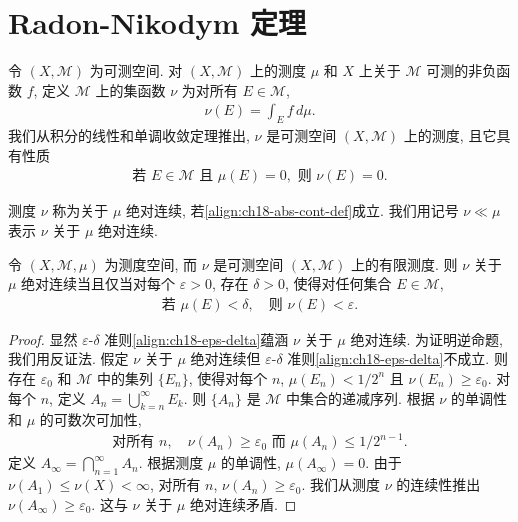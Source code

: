 \documentclass[../../main.tex]{subfiles}
\begin{document}
\section{Radon-Nikodym 定理}\label{section:ch18-radon-nikodym}

令 $(X,\mathcal{M})$ 为可测空间. 对 $(X,\mathcal{M})$ 上的测度 $\mu$ 和 $X$ 上关于 $\mathcal{M}$ 可测的非负函数 $f$, 定义 $\mathcal{M}$ 上的集函数 $\nu$ 为对所有 $E\in\mathcal{M}$,
\begin{align}
\nu(E)=\int_{E}f\,d\mu.\label{align:ch18-rn-def}
\end{align}
我们从积分的线性和单调收敛定理推出, $\nu$ 是可测空间 $(X,\mathcal{M})$ 上的测度, 且它具有性质
\begin{align}
\text{若 }E\in\mathcal{M}\text{ 且 }\mu(E)=0,\text{ 则 }\nu(E)=0.\label{align:ch18-abs-cont-def}
\end{align}

\begin{definition}[绝对连续]\label{definition:ch18-abs-continuous}
测度 $\nu$ 称为关于 $\mu$ 绝对连续, 若\eqref{align:ch18-abs-cont-def}成立. 我们用记号 $\nu\ll\mu$ 表示 $\nu$ 关于 $\mu$ 绝对连续.
\end{definition}

\begin{proposition}\label{proposition:ch18-abs-cont-eps-delta}
令 $(X,\mathcal{M},\mu)$ 为测度空间, 而 $\nu$ 是可测空间 $(X,\mathcal{M})$ 上的有限测度. 则 $\nu$ 关于 $\mu$ 绝对连续当且仅当对每个 $\varepsilon>0$, 存在 $\delta>0$, 使得对任何集合 $E\in\mathcal{M}$,
\begin{align}
\text{若 }\mu(E)<\delta,\quad\text{则 }\nu(E)<\varepsilon.\label{align:ch18-eps-delta}
\end{align}
\end{proposition}

\begin{proof}
显然 $\varepsilon$-$\delta$ 准则\eqref{align:ch18-eps-delta}蕴涵 $\nu$ 关于 $\mu$ 绝对连续. 为证明逆命题, 我们用反证法. 假定 $\nu$ 关于 $\mu$ 绝对连续但 $\varepsilon$-$\delta$ 准则\eqref{align:ch18-eps-delta}不成立. 则存在 $\varepsilon_{0}$ 和 $\mathcal{M}$ 中的集列 $\{E_{n}\}$, 使得对每个 $n$, $\mu(E_{n})<1/2^{n}$ 且 $\nu(E_{n})\geqslant\varepsilon_{0}$. 对每个 $n$, 定义 $A_{n}=\bigcup_{k=n}^{\infty}E_{k}$. 则 $\{A_{n}\}$ 是 $\mathcal{M}$ 中集合的递减序列. 根据 $\nu$ 的单调性和 $\mu$ 的可数次可加性,
\begin{align*}
\text{对所有 }n,\quad\nu(A_{n})\geqslant\varepsilon_{0}\text{ 而 }\mu(A_{n})\leqslant 1/2^{n-1}.
\end{align*}
定义 $A_{\infty}=\bigcap_{n=1}^{\infty}A_{n}$. 根据测度 $\mu$ 的单调性, $\mu(A_{\infty})=0$. 由于 $\nu(A_{1})\leqslant\nu(X)<\infty$, 对所有 $n$, $\nu(A_{n})\geqslant\varepsilon_{0}$. 我们从测度 $\nu$ 的连续性推出 $\nu(A_{\infty})\geqslant\varepsilon_{0}$. 这与 $\nu$ 关于 $\mu$ 绝对连续矛盾.
\end{proof}
\end{document}
